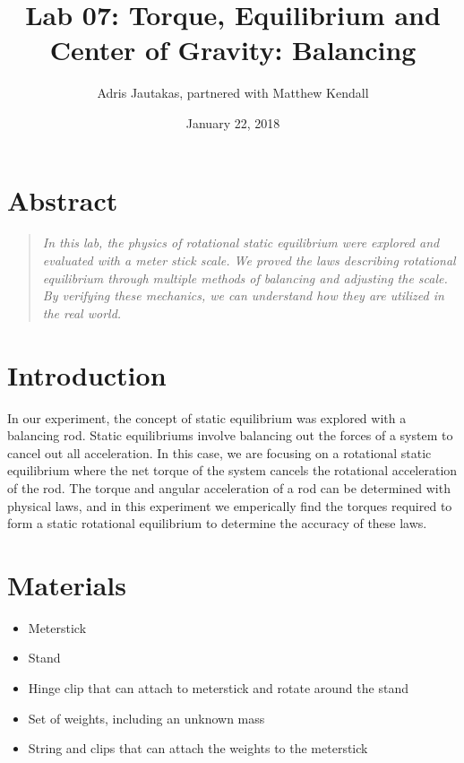 \documentclass[12pt]{article}
\title{Lab 07: Torque, Equilibrium and Center of Gravity: Balancing}
\author{Adris Jautakas, partnered with Matthew Kendall}
\date{January 22, 2018}
\begin{document}
    \maketitle
    \pagebreak
    \section*{Abstract}
        \begin{quote}
        {\textit {\small 
            In this lab, the physics of rotational static equilibrium were 
            explored and evaluated with a meter stick scale. We proved the
            laws describing rotational equilibrium through multiple methods
            of balancing and adjusting the scale. By verifying these mechanics,
            we can understand how they are utilized in the real world.
        } }
        \end{quote}

    \section{Introduction}
        In our experiment, the concept of static equilibrium was explored
        with a balancing rod. Static equilibriums involve balancing out the
        forces of a system to cancel out all acceleration. In this case, we are
        focusing on a rotational static equilibrium where the net torque of the
        system cancels the rotational acceleration of the rod. The torque and
        angular acceleration of a rod can be determined with physical laws, and
        in this experiment we emperically find the torques required to form a
        static rotational equilibrium to determine the accuracy of these laws.

    \section{Materials}
        \begin{itemize}
            \item Meterstick
            \item Stand
            \item Hinge clip that can attach to meterstick and rotate around the 
                  stand
            \item Set of weights, including an unknown mass
            \item String and clips that can attach the weights to the meterstick
        \end{itemize}
    
\end{document}
